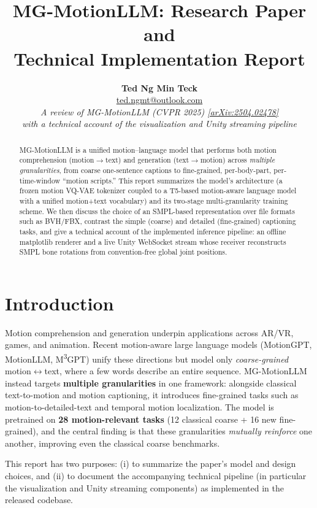 \documentclass[10pt,twocolumn]{article}
\title{\vspace{-1.0cm}\color{accent}\bfseries
  MG-MotionLLM: Research Paper and\\ Technical Implementation Report\vspace{2pt}}
\author{
  \textbf{Ted Ng Min Teck}\\[2pt]
  \normalsize\href{mailto:ted.ngmt@outlook.com}{ted.ngmt@outlook.com}\\[2pt]
  \normalsize\itshape A review of MG-MotionLLM (CVPR 2025)
  \href{https://arxiv.org/abs/2504.02478}{[arXiv:2504.02478]}\\
  \normalsize\itshape with a technical account of the visualization and Unity streaming pipeline
}
\date{}
\begin{document}
\maketitle

\begin{abstract}
\noindent MG-MotionLLM is a unified motion--language model that performs both motion
comprehension (motion$\rightarrow$text) and generation (text$\rightarrow$motion) across
\emph{multiple granularities}, from coarse one-sentence captions to fine-grained, per-body-part,
per-time-window ``motion scripts.'' This report summarizes the model's architecture (a frozen
motion VQ-VAE tokenizer coupled to a T5-based motion-aware language model with a unified
motion+text vocabulary) and its two-stage multi-granularity training scheme. We then discuss
the choice of an SMPL-based representation over file formats such as BVH/FBX, contrast the simple
(coarse) and detailed (fine-grained) captioning tasks, and give a technical account of the
implemented inference pipeline: an offline matplotlib renderer and a live Unity WebSocket stream
whose receiver reconstructs SMPL bone rotations from convention-free global joint positions.
\end{abstract}

\section{Introduction}
Motion comprehension and generation underpin applications across AR/VR, games, and animation.
Recent motion-aware large language models (MotionGPT, MotionLLM, M\textsuperscript{3}GPT) unify
these directions but model only \emph{coarse-grained} motion$\leftrightarrow$text, where a few
words describe an entire sequence. MG-MotionLLM~\cite{mgmotionllm} instead targets
\textbf{multiple granularities} in one framework: alongside classical text-to-motion and motion
captioning, it introduces fine-grained tasks such as motion-to-detailed-text and temporal motion
localization. The model is pretrained on \textbf{28 motion-relevant tasks} (12 classical coarse +
16 new fine-grained), and the central finding is that these granularities \emph{mutually reinforce}
one another, improving even the classical coarse benchmarks.

This report has two purposes: (i) to summarize the paper's model and design choices, and (ii) to
document the accompanying technical pipeline (in particular the visualization and Unity
streaming components) as implemented in the released codebase.
\end{document}
